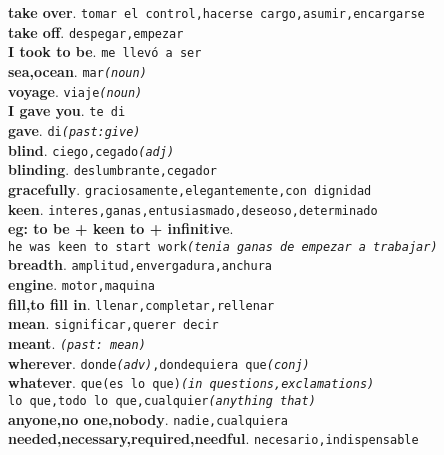 \documentclass[twocolumn]{article}
\begin{document}
	\textsf{\textbf{take over}}. \texttt{tomar el control,hacerse cargo,asumir,encargarse}\\
	\textsf{\textbf{take off}}. \texttt{despegar,empezar}\\
	\textsf{\textbf{I took to be}}. \texttt{me llev\'o a ser}\\
	\textsf{\textbf{sea,ocean}}. \texttt{mar{\scriptsize \textsl{(noun)}}}\\
	\textsf{\textbf{voyage}}. \texttt{viaje{\scriptsize \textsl{(noun)}}}\\
	\textsf{\textbf{I gave you}}. \texttt{te di}\\
	\textsf{\textbf{gave}}. \texttt{di{\scriptsize \textsl{(past:give)}}}\\
	\textsf{\textbf{blind}}. \texttt{ciego,cegado{\scriptsize \textsl{(adj)}}}\\
	\textsf{\textbf{blinding}}. \texttt{deslumbrante,cegador}\\
	\textsf{\textbf{gracefully}}. \texttt{graciosamente,elegantemente,con dignidad}\\
	\textsf{\textbf{keen}}. \texttt{interes,ganas,entusiasmado,deseoso,determinado}\\
	{\scriptsize \textsf{\textbf{eg: to be + keen to + infinitive}}.\\
	\texttt{he was keen to start work{\scriptsize \textsl{(tenia ganas de empezar a trabajar)}}}}\\
	\textsf{\textbf{breadth}}. \texttt{amplitud,envergadura,anchura}\\
	\textsf{\textbf{engine}}. \texttt{motor,maquina}\\
	\textsf{\textbf{fill,to fill in}}. \texttt{llenar,completar,rellenar}\\
	\textsf{\textbf{mean}}. \texttt{significar,querer decir}\\
	\textsf{\textbf{meant}}. \texttt{{\scriptsize \textsl{(past: mean)}}}\\
	\textsf{\textbf{wherever}}. \texttt{donde{\scriptsize \textsl{(adv)}},dondequiera que{\scriptsize \textsl{(conj)}}}\\
	\textsf{\textbf{whatever}}. \texttt{que(es lo que){\scriptsize \textsl{(in questions,exclamations)}}\\
										         lo que,todo lo que,cualquier{\scriptsize \textsl{(anything that)}}}\\
	\textsf{\textbf{anyone,no one,nobody}}. \texttt{nadie,cualquiera}\\
	\textsf{\textbf{needed,necessary,required,needful}}. \texttt{necesario,indispensable}\\
\end{document}
